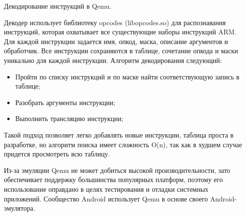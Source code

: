 Декодирование инструкций в Qemu.

Декодер использует библиотеку opcodes (libopcodes.so) для распознавания инструкций, которая охватывает все существующие наборы инструкций ARM. Для каждой инструкции задается имя, опкод, маска, описание аргументов и обработчик. Все инструкции сохраняются в таблице, сочетание опкода и маски уникально для каждой инструкции. Алгоритм декодирования следующий:

\begin{itemize}
    \item Пройти по списку инструкций и по маске найти соответствующую запись в таблице;
    \item Разобрать аргументы инструкции;
    \item Выполнить трансляцию инструкции;
\end{itemize}

Такой подход позволяет легко добавлять новые инструкции, таблица проста в разработке, но алгоритм поиска имеет сложность O(n), так как в худшем случае придется просмотреть всю таблицу.

Из-за эмуляции Qemu не может добиться высокой производительности, зато обеспечивает поддержку большинства популярных платформ, поэтому его использование оправдано в целях тестирования и отладки системных приложений. Сообщество Android использует Qemu в основе своего Android-эмулятора.






